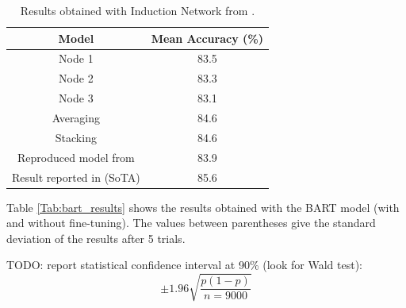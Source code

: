         \begin{table}[h!]
      \centering
      \begin{tabular}{|c|c|}
        \hline
        Model & Mean Accuracy (\%) \\
        \hline
        Node 1 & 83.5 \\
        Node 2 & 83.3 \\
        Node 3 & 83.1 \\
        Averaging & 84.6 \\
        Stacking & 84.6 \\
        Reproduced model from \cite{geng2019induction} & 83.9 \\
        Result reported in \cite{geng2019induction} (SoTA) & 85.6 \\
        \hline
      \end{tabular}
      \caption{Results obtained with Induction Network from \cite{geng2019induction}.}\label{Tab:induction_results}
    \end{table}
    
    Table \ref{Tab:bart_results} shows the results obtained with the BART model (with and without fine-tuning). The values between parentheses give the standard deviation of the results after 5 trials.
    
    TODO: report statistical confidence interval at 90\% (look for Wald test):
    $$\pm 1.96 \sqrt{\frac {p(1-p)}{n=9000}}$$
    

